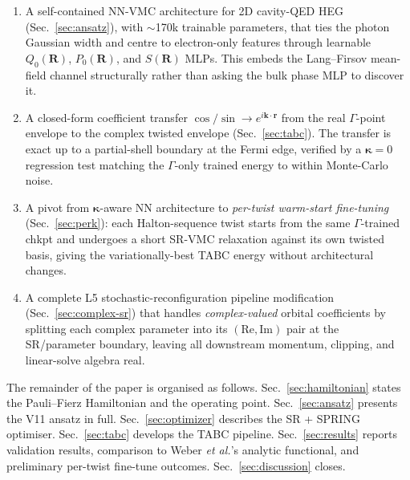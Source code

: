 \documentclass[reprint,amsmath,amssymb,aps,prb,floatfix,nofootinbib]{revtex4-2}
\begin{document}
\begin{enumerate}
\item A self-contained NN-VMC architecture for 2D cavity-QED HEG
      (Sec.~\ref{sec:ansatz}), with $\sim$170k trainable parameters,
      that ties the photon Gaussian width and centre to electron-only
      features through learnable $Q_0(\mathbf{R})$, $P_0(\mathbf{R})$,
      and $S(\mathbf{R})$ MLPs.  This embeds the Lang--Firsov
      mean-field channel structurally rather than asking the bulk
      phase MLP to discover it.
\item A closed-form coefficient transfer $\cos/\sin \to e^{i \mathbf{k}
      \cdot \mathbf{r}}$ from the real $\Gamma$-point envelope to the
      complex twisted envelope (Sec.~\ref{sec:tabc}).  The transfer
      is exact up to a partial-shell boundary at the Fermi edge,
      verified by a $\bm{\kappa}{=}0$ regression test matching the
      $\Gamma$-only trained energy to within Monte-Carlo noise.
\item A pivot from $\bm{\kappa}$-aware NN architecture to
      \emph{per-twist warm-start fine-tuning} (Sec.~\ref{sec:perk}):
      each Halton-sequence twist starts from the same $\Gamma$-trained
      chkpt and undergoes a short SR-VMC relaxation against its own
      twisted basis, giving the variationally-best TABC energy
      without architectural changes.
\item A complete L5 stochastic-reconfiguration pipeline modification
      (Sec.~\ref{sec:complex-sr}) that handles \emph{complex-valued}
      orbital coefficients by splitting each complex parameter into
      its $(\mathrm{Re}, \mathrm{Im})$ pair at the SR/parameter
      boundary, leaving all downstream momentum, clipping, and
      linear-solve algebra real.
\end{enumerate}

The remainder of the paper is organised as follows.
Sec.~\ref{sec:hamiltonian} states the Pauli--Fierz Hamiltonian and
the operating point.  Sec.~\ref{sec:ansatz} presents the V11 ansatz
in full.  Sec.~\ref{sec:optimizer} describes the SR + SPRING
optimiser.  Sec.~\ref{sec:tabc} develops the TABC pipeline.
Sec.~\ref{sec:results} reports validation results, comparison to
Weber \emph{et al.}'s analytic functional, and preliminary per-twist
fine-tune outcomes.  Sec.~\ref{sec:discussion} closes.

\end{document}

